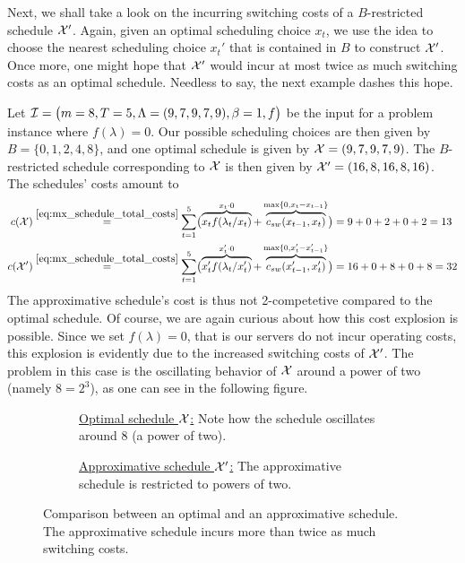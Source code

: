 Next, we shall take a look on the incurring switching costs of a $B$-restricted schedule $\mathcal{X}'$. Again, given an optimal scheduling choice $x_t$, we use the idea to choose the nearest scheduling choice $x_t'$ that is contained in $B$ to construct $\mathcal{X}'$. Once more, one might hope that $\mathcal{X}'$ would incur at most twice as much switching costs as an optimal schedule. Needless to say, the next example dashes this hope.
\begin{exmpl}
Let $\mathcal{I}=\bigl(m=8,T=5,\Lambda=(9,7,9,7,9),\beta=1,f\bigr)$ be the input for a problem instance where $f(\lambda)=0$. Our possible scheduling choices are then given by $B=\{0,1,2,4,8\}$, and one optimal schedule is given by $\mathcal{X}=(9,7,9,7,9)$. The $B$-restricted schedule corresponding to $\mathcal{X}$ is then given by $\mathcal{X}'=(16,8,16,8,16)$. The schedules' costs amount to
\begin{align*}
	c(\mathcal{X})&\stackrel{\eqref{eq:mx_schedule_total_costs}}{=}\sum\limits_{t=1}^{5}\bigl(\overbrace{x_tf(\lambda_t/x_t)}^{x_t\cdot 0}+\overbrace{c_{sw}(x_{t-1},x_t)}^{\max\{0,x_t-x_{t-1}\}}\bigr)=9+0+2+0+2=13\\
	c(\mathcal{X}')&\stackrel{\eqref{eq:mx_schedule_total_costs}}{=}\sum\limits_{t=1}^{5}\bigl(\overbrace{x_t'f(\lambda_t/x_t')}^{x_t'\cdot 0}+\overbrace{c_{sw}(x_{t-1}',x_t')}^{\max\{0,x_t'-x_{t-1}'\}}\bigr)=16+0+8+0+8=32
\end{align*}
The approximative schedule's cost is thus not 2-competetive compared to the optimal schedule. Of course, we are again curious about how this cost explosion is possible. Since we set $f(\lambda)=0$, that is our servers do not incur operating costs, this explosion is evidently due to the increased switching costs of $\mathcal{X}'$. The problem in this case is the oscillating behavior of $\mathcal{X}$ around a power of two (namely $8=2^3$), as one can see in the following figure. 
\begin{figure}[H]
\captionsetup[subfigure]{labelformat=empty}
\begin{subfigure}[b]{0.47\textwidth}

	\caption{\underline{Optimal schedule $\mathcal{X}$:} Note how the schedule oscillates around 8 (a power of two).}
\end{subfigure}
\hfill
\begin{subfigure}[b]{0.47\textwidth}

	\caption{\underline{Approximative schedule $\mathcal{X}'$:} The approximative schedule is restricted to powers of two.}
\end{subfigure}
\caption{Comparison between an optimal and an approximative schedule. The approximative schedule incurs more than twice as much switching costs.}
\label{fig:adaption-schedule}
\end{figure}
\end{exmpl}
